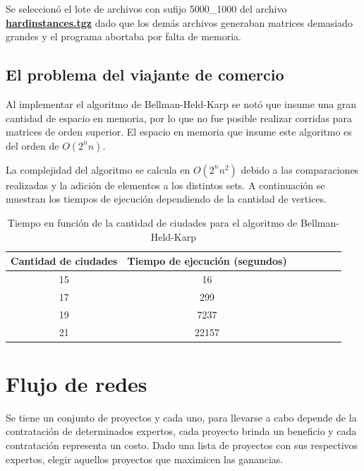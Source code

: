\documentclass[a4paper,10pt]{article}
\begin{document}
\bigskip

Se seleccionó el lote de archivos con sufijo 5000\_1000 del archivo \href{http://www.diku.dk/~pisinger/hardinstances_pisinger.tgz}{\textbf{\textcolor[rgb]{0.0,0.0,0.039215688}{hardinstances.tgz}}} dado que los demás archivos generaban matrices demasiado grandes y el programa abortaba por falta de memoria.

\bigskip
\bigskip


\subsection{El problema del viajante de comercio}
Al implementar el algoritmo de Bellman-Held-Karp se notó que insume una gran cantidad de espacio en memoria, por lo que no fue posible realizar corridas para matrices de orden superior. El espacio en memoria que insume este algoritmo es del orden de $O(2^n n)$.

La complejidad del algoritmo se calcula en $O(2^n n^2)$ debido a las comparaciones realizadas y la adición de elementos a los distintos sets. A continuación se muestran los tiempos de ejecución dependiendo de la cantidad de vertices.

\begin{table}[H]
\centering
\begin{tabular}{|c|c|c|c|c|c|c|}
\hline
Cantidad de ciudades	& Tiempo de ejecución (segundos)\\\hline
15						& 16\\\hline
17						& 299\\\hline
19						& 7237\\\hline
21						& 22157\\\hline
\end{tabular}
\caption{Tiempo en función de la cantidad de ciudades para el algoritmo de Bellman-Held-Karp}
\label{tab:held}
\end{table}



\section{Flujo de redes}

Se tiene un conjunto de proyectos y cada uno, para llevarse a cabo depende de la contratación de
determinados expertos, cada proyecto brinda un beneficio y cada contratación representa un costo. Dado una lista de
proyectos con sus respectivos expertos, elegir aquellos proyectos que maximicen las ganancias.
\end{document}
